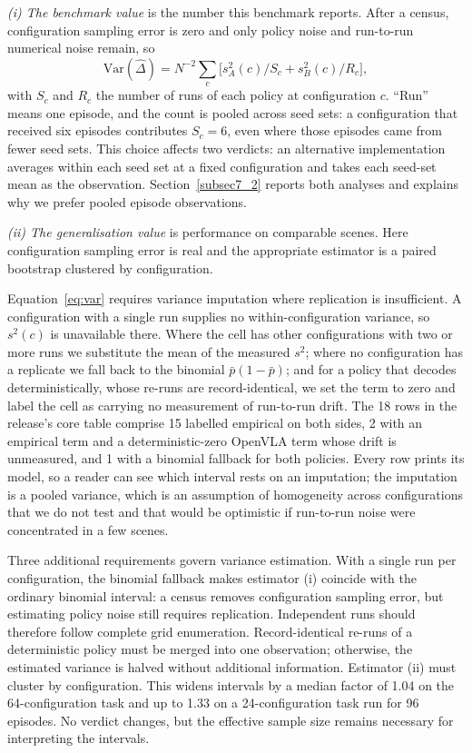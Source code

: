 \documentclass[pdflatex,iicol,sn-apa]{sn-jnl}
\theoremstyle{remark}
\begin{document}
\emph{(i) The benchmark value} is the number this benchmark reports. After a census, configuration
sampling error is zero and only policy noise and run-to-run numerical noise remain, so
\begin{equation}\label{eq:var}
\mathrm{Var}(\hat\Delta) = N^{-2} \sum_{c} \big[ s^2_A(c)/S_c + s^2_B(c)/R_c \big],
\end{equation}
with $S_c$ and $R_c$ the number of runs of each policy at configuration $c$. ``Run'' means one
episode, and the count is pooled across seed sets: a configuration that received six
episodes contributes $S_c = 6$, even where those episodes came from fewer seed sets. This choice
affects two verdicts: an alternative implementation averages within each seed set at a fixed configuration and takes each seed-set mean
as the observation. Section~\ref{subsec7_2} reports both analyses and explains why we prefer
pooled episode observations.

\emph{(ii) The generalisation value} is performance on comparable scenes. Here configuration
sampling error is real and the appropriate estimator is a paired bootstrap clustered by
configuration.

Equation~\eqref{eq:var} requires variance imputation where replication is insufficient. A configuration with a single run supplies no within-configuration variance, so $s^2(c)$ is
unavailable there. Where the cell has other configurations with two or more runs we substitute the
mean of the measured $s^2$; where no configuration has a replicate we fall back to the
binomial $\bar p(1 - \bar p)$; and for a policy that decodes deterministically, whose re-runs are
record-identical, we set the term to zero and label the cell as carrying no measurement of run-to-run
drift. The 18 rows in the release's core table comprise 15 labelled empirical on both sides,
2 with an empirical term and a deterministic-zero OpenVLA term whose drift is unmeasured, and
1 with a binomial fallback for both policies. Every row prints its
model, so a reader can see which interval rests on an imputation; the imputation is a pooled
variance, which is an assumption of homogeneity across configurations that we do not test and that
would be optimistic if run-to-run noise were concentrated in a few scenes.

Three additional requirements govern variance estimation. With a single run per configuration,
the binomial fallback makes estimator (i) coincide with the ordinary binomial interval:
a census removes configuration sampling error, but estimating policy noise still requires
replication. Independent runs should therefore follow complete grid enumeration.
Record-identical re-runs of a deterministic policy must be merged into one observation;
otherwise, the estimated variance is halved without additional information. Estimator (ii)
must cluster by configuration. This widens intervals by a median factor of 1.04 on the
64-configuration task and up to 1.33 on a 24-configuration task run for 96 episodes.
No verdict changes, but the effective sample size remains necessary for interpreting the intervals.
\end{document}
